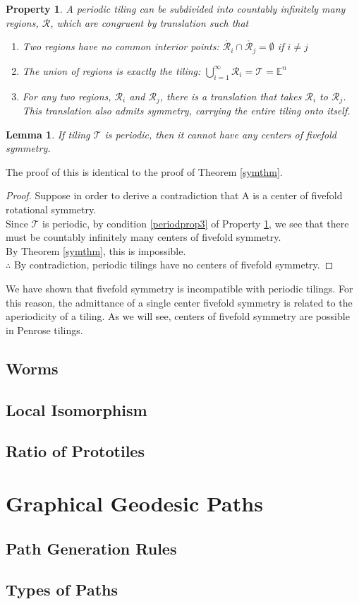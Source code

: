 \documentclass[
  oneside,
  11pt, a4paper,
  footinclude=true,
  headinclude=true,
  cleardoublepage=empty
]{scrbook}
\newtheorem{myprop}{Property}
\newtheorem{mylem}{Lemma}
\begin{document}
\begin{myprop}
A periodic tiling can be subdivided into countably infinitely many regions, $\mathcal{R}$, which are congruent by translation such that
\begin{enumerate}
\item Two regions have no common interior points: $\mathring{\mathcal{R}_i} \cap  \mathring{\mathcal{R}_j}=\emptyset$ if $i\neq j$
\item The union of regions is exactly the tiling: $\bigcup_{i=1}^\infty \mathcal{R}_i = \mathcal{T}=\mathbb{E}^n$
\item For any two regions, $\mathcal{R}_i$ and $\mathcal{R}_j$, there is a translation that takes  $\mathcal{R}_i$ to $\mathcal{R}_j$. This translation also admits symmetry, carrying the entire tiling onto itself. \label{periodprop3}
\end{enumerate}
\label{periodprop}
\end{myprop}

\begin{mylem}
If tiling $\mathcal{T}$ is periodic, then it cannot have any centers of fivefold symmetry.
\end{mylem}
The proof of this is identical to the proof of Theorem \ref{symthm}.
\begin{proof}
Suppose in order to derive a contradiction that A is a center of fivefold rotational symmetry.\\
Since $\mathcal{T}$ is periodic, by condition \ref{periodprop3} of Property \ref{periodprop}, we see that there must be countably infinitely many centers of fivefold symmetry.\\
By Theorem \ref{symthm}, this is impossible.\\
$\therefore$ By contradiction, periodic tilings have no centers of fivefold symmetry.
\end{proof}

We have shown that fivefold symmetry is incompatible with periodic tilings. For this reason, the admittance of a single center fivefold symmetry is related to the aperiodicity of a tiling. As we will see, centers of fivefold symmetry are possible in Penrose tilings. 
\section{Worms}
\section{Local Isomorphism}
\section{Ratio of Prototiles}
\chapter{Graphical Geodesic Paths}
\section{Path Generation Rules}
\section{Types of Paths}


    
\end{document}
